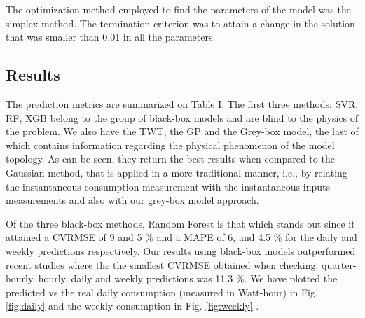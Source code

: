 \documentclass[10pt, conference, compsocconf]{IEEEtran}
\begin{document}
The optimization method employed to find the parameters of the model was the simplex method. The termination criterion was to attain a change in the solution that was smaller than 0.01 in all the parameters. %


\subsection{Results}

The prediction metrics are summarized on Table I. The first three methods: SVR, RF, XGB  belong to the group of black-box models and are blind to the physics of the problem. We also have the TWT, the GP and the Grey-box model, the last of which contains information regarding the physical phenomenon of the model topology. As can be seen, they return the best results when compared to the Gaussian method, that is applied in a more traditional manner, i.e., by relating the instantaneous consumption measurement with the instantaneous inputs measurements and also with our grey-box model approach. 

Of the three black-box methods, Random Forest is that which stands out since it attained a CVRMSE of 9 and 5 \%  and a MAPE of 6, and 4.5 \% for the daily and weekly predictions respectively. Our results using black-box models outperformed recent studies \cite{gallagher2018development} where the the smallest CVRMSE obtained when checking: quarter-hourly, hourly, daily and weekly predictions was 11.3 \%. We have plotted the predicted vs the real daily consumption (measured in Watt-hour) in Fig. \ref{fig:daily} and the weekly consumption in Fig. \ref{fig:weekly} .
\end{document}
